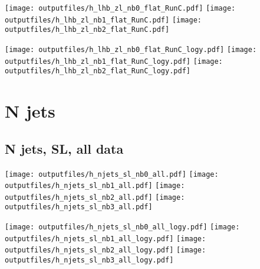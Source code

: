 \documentclass[11pt]{article}
\begin{document}
    \noindent
     \texttt{[image: outputfiles/h\_lhb\_zl\_nb0\_flat\_RunC.pdf]}
     \texttt{[image: outputfiles/h\_lhb\_zl\_nb1\_flat\_RunC.pdf]}
     \texttt{[image: outputfiles/h\_lhb\_zl\_nb2\_flat\_RunC.pdf]}

    \noindent
     \texttt{[image: outputfiles/h\_lhb\_zl\_nb0\_flat\_RunC\_logy.pdf]}
     \texttt{[image: outputfiles/h\_lhb\_zl\_nb1\_flat\_RunC\_logy.pdf]}
     \texttt{[image: outputfiles/h\_lhb\_zl\_nb2\_flat\_RunC\_logy.pdf]}















  \clearpage
   \section{ N jets }

    \subsection{ N jets, SL, all data}

    \noindent
     \texttt{[image: outputfiles/h\_njets\_sl\_nb0\_all.pdf]}
     \texttt{[image: outputfiles/h\_njets\_sl\_nb1\_all.pdf]}
     \texttt{[image: outputfiles/h\_njets\_sl\_nb2\_all.pdf]}
     \texttt{[image: outputfiles/h\_njets\_sl\_nb3\_all.pdf]}

    \noindent
     \texttt{[image: outputfiles/h\_njets\_sl\_nb0\_all\_logy.pdf]}
     \texttt{[image: outputfiles/h\_njets\_sl\_nb1\_all\_logy.pdf]}
     \texttt{[image: outputfiles/h\_njets\_sl\_nb2\_all\_logy.pdf]}
     \texttt{[image: outputfiles/h\_njets\_sl\_nb3\_all\_logy.pdf]}
\end{document}
